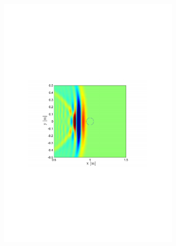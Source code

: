\begin{figure}
        \centering
        \begin{subfigure}[b]{0.48\textwidth}
                \centering
                \includegraphics[width=\textwidth]{grafiken/02_Konzeptionierung/sim_wave_3000_1}
        \end{subfigure}
        ~ %
        \begin{subfigure}[b]{0.48\textwidth}
                \centering

\end{subfigure}
\end{figure}
